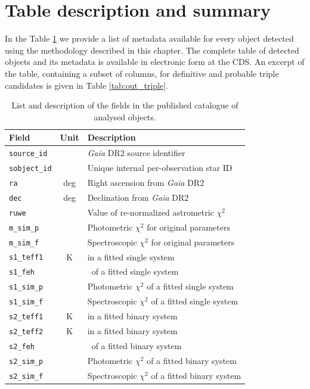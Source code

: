 \section{Table description and summary}
\label{sec:outres}

In the Table \ref{tab:out_table_triple} we provide a list of metadata available for every object detected using the methodology described in this chapter. The complete table of detected objects and its metadata is available in electronic form at the CDS. An excerpt of the table, containing a subset of columns, for definitive and probable triple candidates is given in Table \ref{tab:out_triple}.

\begin{table}
	\centering
	\caption{List and description of the fields in the published catalogue of analysed objects.}
	\label{tab:out_table_triple}
	\begin{tabular}{l c l}
		\hline
		Field & Unit & Description \\ 
		\hline \hline
		\texttt{source\_id} & & {\it Gaia} DR2 source identifier \\
		\texttt{sobject\_id} & & Unique internal per-observation star ID \\
		\texttt{ra} & deg & Right ascension from {\it Gaia} DR2 \\
		\texttt{dec} & deg & Declination from {\it Gaia} DR2 \\
		\texttt{ruwe} & & Value of re-normalized astrometric $\chi^2$ \\
		
		\texttt{m\_sim\_p} & & Photometric $\chi^2$ for original parameters \\
		\texttt{m\_sim\_f} & & Spectroscopic $\chi^2$ for original parameters \\
		
		\texttt{s1\_teff1} & K & \Teffn{1} in a fitted single system \\
		\texttt{s1\_feh} & & \Feh\ of a fitted single system \\
		\texttt{s1\_sim\_p} & & Photometric $\chi^2$ of a fitted single system \\
		\texttt{s1\_sim\_f} & & Spectroscopic $\chi^2$ of a fitted single system\\
		
		\texttt{s2\_teff1} & K & \Teffn{1} in a fitted binary system \\	
		\texttt{s2\_teff2} & K & \Teffn{2} in a fitted binary system \\
		\texttt{s2\_feh} & & \Feh\ of a fitted binary system \\
		\texttt{s2\_sim\_p} & & Photometric $\chi^2$ of a fitted binary system \\
		\texttt{s2\_sim\_f} & & Spectroscopic $\chi^2$ of a fitted binary system\\
		

\end{tabular}
\end{table}
